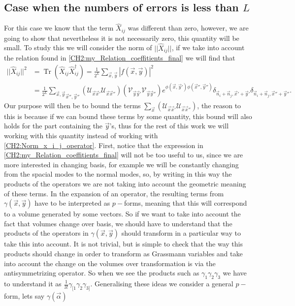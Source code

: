 \subsection{Case when the numbers of errors is less than $L$}
For this case we know that the term $\hat{X}_{ij}$ was different than zero, however, we are going to show that nevertheless it is not necessarily zero, this quantity will be small. To study this we will consider the norm of $||\hat{X}_{ij}||$, if we take into account the relation found in \eqref{CH2:my_Relation_coeffitients_final} we will find that
\begin{equation}
\begin{aligned}
||\hat{X}_{ij}||^{2}&=\operatorname{Tr}\left(\hat{X}_{ij} \hat{X}^{\dagger}_{ij}\right) = \frac{1}{2^L}\sum_{\vec{x},\vec{y}}|f(\vec{x},\vec{y})|^2\\
&=\frac{1}{2^L}\underset{\vec{x}'',\vec{y}''}{\sum_{\vec{x},\vec{y}}}\left(	\mathcal{U}_{\vec{x}\vec{x}'} \mathcal{U}_{\vec{x}\vec{x}''}\right) \left(	\mathcal{V}_{\vec{y}\vec{y}'} \mathcal{V}_{\vec{y}\vec{y}''}\right) e^{\phi(\vec{x},\vec{y}')\phi(\vec{x}'',\vec{y}'')}\delta_{\vec{n}_i+\vec{n}_j,\vec{x}'+\vec{y}'}\delta_{\vec{n}_i+\vec{n}_j,\vec{x}''+\vec{y}''}.
\end{aligned}
\label{CH2:Norm_x_i_j_operator}
\end{equation}
\indent Our purpose will then be to bound the terms $\sum_{\vec{x}}\left(	\mathcal{U}_{\vec{x}\vec{x}'} \mathcal{U}_{\vec{x}\vec{x}''}\right)$, the reason to this is because if we can bound these terms by some quantity, this bound will also holds for the part containing the $\vec{y}$'s, thus for the rest of this work we will working with this quantity instead of working with \eqref{CH2:Norm_x_i_j_operator}. First, notice that the expression in \eqref{CH2:my_Relation_coeffitients_final} will not be too useful to us, since we are more interested in changing basis, for example we will be constantly changing from the spacial modes to the normal modes, so, by writing in this way the products of the operators we are not taking into account the geometric meaning of these terms. In the expansion of an operator, the resulting terms from $\gamma(\vec{x},\vec{y})$ have to be interpreted as $p-$forms, meaning that this will correspond to a volume generated by some vectors. So if we want to take into account the fact that volumes change over basis, we should have to understand that the products of the operators in $\gamma(\vec{x},\vec{y})$ should transform in a particular way to take this into account. It is not trivial, but is simple to check that the way this products should change in order to transform as Grassmann variables and take into account the change on the volumes over transformation is via the antisymmetrizing operator. So when we see the products such as $\gamma_{1}\gamma_{2}\gamma_{3}$ we have to understand it as $\frac{1}{3!}\gamma_{[1}\gamma_2\gamma_{3]}$. Generalising these ideas we consider a general $p-$form, lets say $\gamma(\vec{\alpha})$
